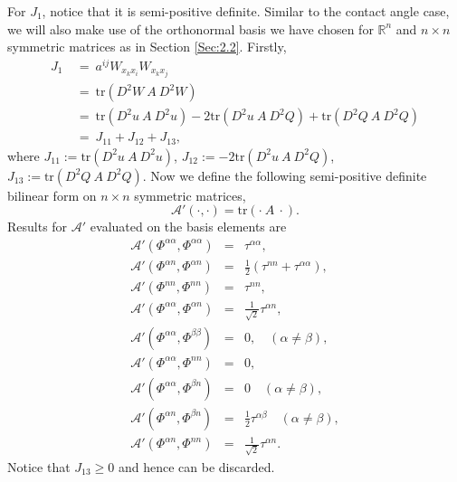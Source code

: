 \documentclass[12pt]{article}
\numberwithin{equation}{section}
\theoremstyle{plain}
\theoremstyle{definition}
\theoremstyle{remark}
\begin{document}
For $J_1$, notice that it is semi-positive definite.
Similar to the contact angle case, we will also make use of the orthonormal basis we have chosen for $\mathbb{R}^n$ and $n \times n$ symmetric matrices as in Section \ref{Sec:2.2}.  Firstly,
\begin{equation} \label{eq:neuJ1}
\begin{split}
   J_1 &\ = \ a^{ij} W_{x_k x_i} W_{x_k x_j} \\ 
   &\ =\ \text{tr}(D^2 W \  A \  D^2 W) \\
   &\ =\ \text{tr}(D^2 u \  A \  D^2 u) - 2 \text{tr}(D^2 u \  A \  D^2 Q)  + \text{tr}(D^2 Q \  A \  D^2 Q) \\
   &\ =\ J_{11} + J_{12} + J_{13},
\end{split}
\end{equation}
where 
$J_{11} :=\text{tr}(D^2 u \  A \  D^2 u)$,
$J_{12} :=  - 2 \text{tr}(D^2 u \  A \  D^2 Q)$,
$J_{13} :=  \text{tr}(D^2 Q \  A \  D^2 Q).$
Now we define the following semi-positive definite bilinear form on $n\times n$ symmetric matrices,
\begin{equation*}
    \mathcal{A}' (\cdot,\cdot) = \text{tr}( \cdot \  A \  \cdot).
\end{equation*}
Results for $\mathcal{A}'$ evaluated on the basis elements are
\begin{eqnarray*}
    \mathcal{A}' (\Phi^{\alpha \alpha},\Phi^{\alpha \alpha}) & = & \tau^{\alpha \alpha},\\
    \mathcal{A}' (\Phi^{\alpha n},\Phi^{\alpha n}) &=& \frac{1}{2} (\tau^{n n} + \tau^{\alpha \alpha}),\\
    \mathcal{A}' (\Phi^{n n},\Phi^{n n}) & = &\tau^{n n},\\
    \mathcal{A}' (\Phi^{\alpha \alpha},\Phi^{\alpha n}) &=& \frac{1}{\sqrt{2}} \tau^{\alpha n},\\
    \mathcal{A}' (\Phi^{\alpha \alpha},\Phi^{\beta \beta}) &=& 0, \quad (\alpha \neq \beta),\\
    \mathcal{A}' (\Phi^{\alpha \alpha},\Phi^{n n}) &=&0,\\
    \mathcal{A}' (\Phi^{\alpha \alpha},\Phi^{\beta n}) &=& 0 \quad (\alpha \neq \beta),\\
    \mathcal{A}' (\Phi^{\alpha n},\Phi^{\beta n}) &=& \frac{1}{2} \tau^{\alpha \beta} \quad (\alpha \neq \beta),\\
    \mathcal{A}' (\Phi^{\alpha n},\Phi^{n n}) &=& \frac{1}{\sqrt{2}} \tau^{\alpha n}.
\end{eqnarray*}
Notice that $J_{13}\geq 0$ and hence can be discarded.
\end{document}
